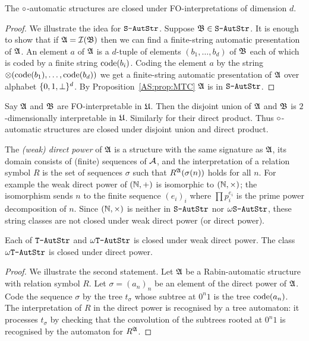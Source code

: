 \begin{proposition} \cite{BlGr00}
The $\circ$-automatic structures are closed under  FO-interpretations of dimension $d$.
\end{proposition}

\begin{proof}
We illustrate the idea for $\mbox{\tt S-AutStr}$. Suppose $\mathfrak{B} \in \mbox{\tt S-AutStr}$. It is enough to show that if $\mathfrak{A} = {\mathcal I}(\mathfrak{B})$ then we can find a finite-string automatic presentation of $\mathfrak{A}$. 
An element $a$ of $\mathfrak{A}$ is a $d$-tuple of elements $(b_1,\dots,b_d)$ of $\mathfrak{B}$ each of which is coded by a finite string 
${\rm code}({b_i})$. Coding the element $a$ by the string $\otimes({\rm code}({b_1}),\dots,{\rm code}({b_d}))$ we get a finite-string automatic presentation of $\mathfrak{A}$ over alphabet 
$\{0,1,{\perp}\}^d$. By Proposition~\ref{AS:prop:MTC} $\mathfrak{A}$ is in $\mbox{\tt S-AutStr}$.
\end{proof}


Say $\mathfrak{A}$ and $\mathfrak{B}$ are FO-interpretable in $\mathfrak{U}$. Then the disjoint union of $\mathfrak{A}$ and $\mathfrak{B}$ is $2$-dimensionally interpretable in $\mathfrak{U}$. Similarly for their direct product.
Thus $\circ$-automatic structures are closed under disjoint union and direct product.

The {\em (weak) direct power} of $\mathfrak{A}$ is a structure with the same signature as $\mathfrak{A}$, its domain consists 
of (finite) sequences of ${\mathcal A}$, and the 
interpretation of a relation symbol $R$ is the set of sequences $\sigma$ such that $R^{\mathfrak{A}}(\sigma(n))$ holds for all $n$.
For example the weak direct power of $(\mathbb{N},+)$ is isomorphic to $(\mathbb{N},\times)$; the isomorphism sends $n$ to  the finite sequence $(e_i)_i$ where
$ \prod p_i^{e_i}$ is the prime power decomposition of $n$. Since $(\mathbb{N},\times)$ is neither in $\mbox{\tt S-AutStr}$ nor $\mbox{\tt $\omega$S-AutStr}$, these string classes are not closed under weak direct power (or direct power).
 
\begin{proposition} \label{AS:prop:powerclosure} \cite{Blum99}
Each of  $\mbox{\tt T-AutStr}$ and $\mbox{\tt $\omega$T-AutStr}$ is closed under weak direct power. The class $\mbox{\tt $\omega$T-AutStr}$ is closed under direct power.
\end{proposition}

\begin{proof}
We illustrate the second statement.
Let $\mathfrak{A}$ be a Rabin-automatic structure with relation symbol $R$.
Let $\sigma = (a_n)_n$ be an element of the direct power of $\mathfrak{A}$.
Code the sequence $\sigma$ by the tree $t_\sigma$ whose subtree at $0^n1$ is the tree ${\rm code}({a_n})$.
The interpretation of $R$ in the direct power is recognised by a tree automaton: it  processes $t_\sigma$ by checking
that the convolution of the subtrees rooted at $0^n1$ is recognised by the automaton for $R^{\mathfrak{A}}$.
\end{proof}

